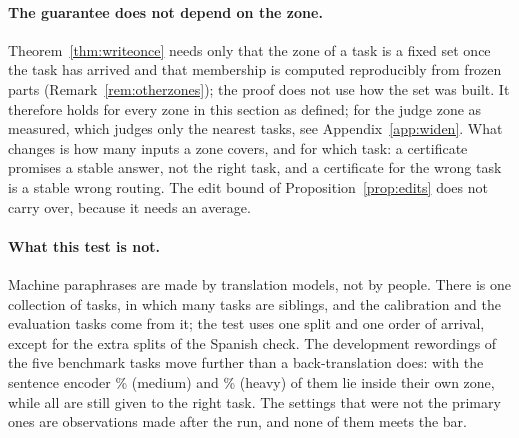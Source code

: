 \paragraph{The guarantee does not depend on the zone.} Theorem~\ref{thm:writeonce} needs only that the
zone of a task is a fixed set once the task has arrived and that membership is computed reproducibly from frozen parts
(Remark~\ref{rem:otherzones}); the proof does not use how the set was built. It therefore holds for every zone in this
section as defined; for the judge zone as measured, which judges only the \WidenJudgeLimit{} nearest tasks, see Appendix~\ref{app:widen}. What changes is how many inputs a zone covers, and for which task: a certificate promises a
stable answer, not the right task, and a certificate for the wrong task is a stable wrong routing.
The edit bound of Proposition~\ref{prop:edits} does not carry over, because it needs an average.

\paragraph{What this test is not.} Machine paraphrases are made by translation models, not by people.
There is one collection of tasks, in which many tasks are siblings, and the calibration and the
evaluation tasks come from it; the test uses one split and one order of arrival, except for the \WidenSplitCount{} extra splits of the Spanish check. The development rewordings of the five benchmark tasks
move further than a back-translation does: with the sentence encoder
\WidenEncBenchMediumZone{}\% (medium) and \WidenEncBenchHeavyZone{}\% (heavy) of them lie inside their own
zone, while all are still given to the right task. The settings that were not the primary ones
are observations made after the run, and none of them meets the bar.

